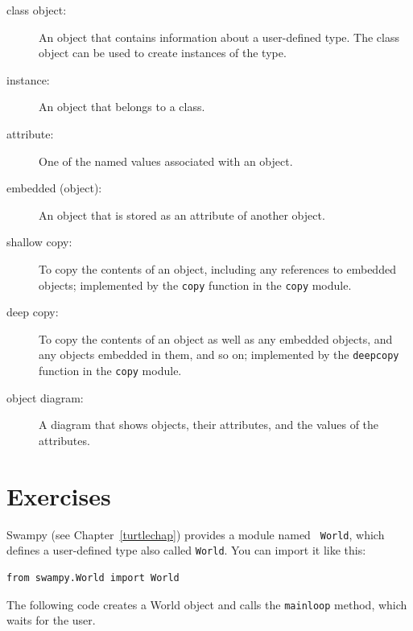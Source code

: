\documentclass[10pt]{book}
\begin{document}
\begin{CJK}{UTF8}{gbsn}
\begin{description}
\item[class object:] An object that contains information about a
user-defined type.  The class object can be used to create instances
of the type.

\item[instance:] An object that belongs to a class.

\item[attribute:] One of the named values associated with an object.

\item[embedded (object):] An object that is stored as an attribute
of another object.

\item[shallow copy:] To copy the contents of an object, including
any references to embedded objects;
implemented by the {\tt copy} function in the {\tt copy} module.

\item[deep copy:] To copy the contents of an object as well as any
embedded objects, and any objects embedded in them, and so on;
implemented by the {\tt deepcopy} function in the {\tt copy} module.

\item[object diagram:] A diagram that shows objects, their
attributes, and the values of the attributes.

\end{description}


\section{Exercises}

\begin{exercise}
\label{canvas}

Swampy (see Chapter~\ref{turtlechap}) provides a module named {\tt
  World}, which defines a user-defined type also called {\tt World}.
You can import it like this:

\begin{verbatim}
from swampy.World import World
\end{verbatim}

The following code creates a World object and calls
the {\tt mainloop} method, which
waits for the user.


\end{exercise}
\end{CJK}
\end{document}
